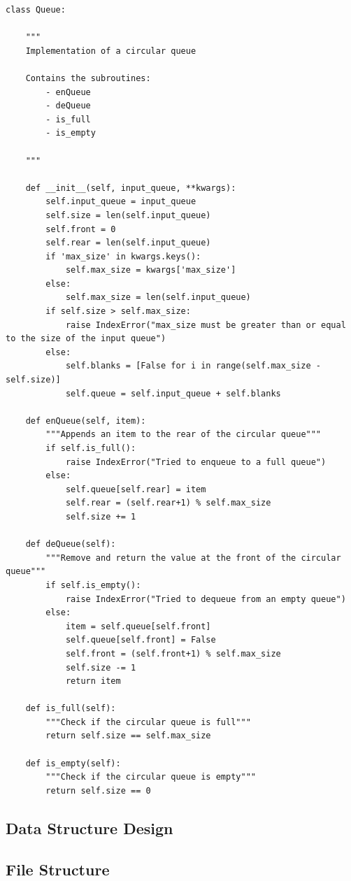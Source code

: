 \documentclass{article}
\begin{document}
\begin{lstlisting}[h]
class Queue:

    """
    Implementation of a circular queue

    Contains the subroutines:
        - enQueue
        - deQueue
        - is_full
        - is_empty

    """

    def __init__(self, input_queue, **kwargs):
        self.input_queue = input_queue
        self.size = len(self.input_queue)
        self.front = 0
        self.rear = len(self.input_queue)
        if 'max_size' in kwargs.keys():
            self.max_size = kwargs['max_size']
        else:
            self.max_size = len(self.input_queue)
        if self.size > self.max_size:
            raise IndexError("max_size must be greater than or equal to the size of the input queue")
        else:
            self.blanks = [False for i in range(self.max_size - self.size)]
            self.queue = self.input_queue + self.blanks

    def enQueue(self, item):
        """Appends an item to the rear of the circular queue"""
        if self.is_full():
            raise IndexError("Tried to enqueue to a full queue")
        else:
            self.queue[self.rear] = item
            self.rear = (self.rear+1) % self.max_size
            self.size += 1

    def deQueue(self):
        """Remove and return the value at the front of the circular queue"""
        if self.is_empty():
            raise IndexError("Tried to dequeue from an empty queue")
        else:
            item = self.queue[self.front]
            self.queue[self.front] = False
            self.front = (self.front+1) % self.max_size
            self.size -= 1
            return item

    def is_full(self):
        """Check if the circular queue is full"""
        return self.size == self.max_size

    def is_empty(self):
        """Check if the circular queue is empty"""
        return self.size == 0
\end{lstlisting}

\clearpage

\subsection{Data Structure Design}

\clearpage

\subsection{File Structure}
\end{document}

